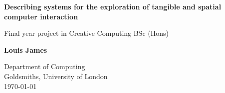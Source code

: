 \begin{titlepage}
   \begin{center}
       \vspace*{1cm}
       \begin{LARGE}
       \textbf{Describing systems for the exploration of tangible and spatial computer interaction}

  
       \end{LARGE}
       \vspace{0.8cm}
        
       \begin{Large}
        Final year project in Creative Computing BSc (Hons) 
       \end{Large}

            
       \vspace{6.5cm}

       \begin{large}
       \textbf{Louis James}
       \end{large}

       \vspace{0.8cm}

       \begin{large}
       Department of Computing \\
       Goldsmiths, University of London\\
       \vspace{0.8cm}
       \today
       \end{large}
            
   \end{center}
\end{titlepage}
